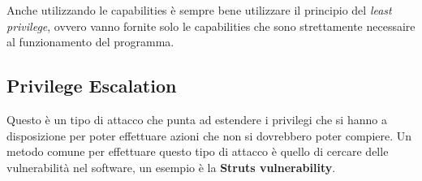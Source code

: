 Anche utilizzando le capabilities è sempre bene utilizzare il principio del
\textit{least privilege}, ovvero vanno fornite solo le capabilities che sono
strettamente necessaire al funzionamento del programma.

\subsection{Privilege Escalation}

Questo è un tipo di attacco che punta ad estendere i privilegi che si hanno a
disposizione per poter effettuare azioni che non si dovrebbero poter compiere.
Un metodo comune per effettuare questo tipo di attacco è quello di cercare delle
vulnerabilità nel software, un esempio è la \textbf{Struts vulnerability}.